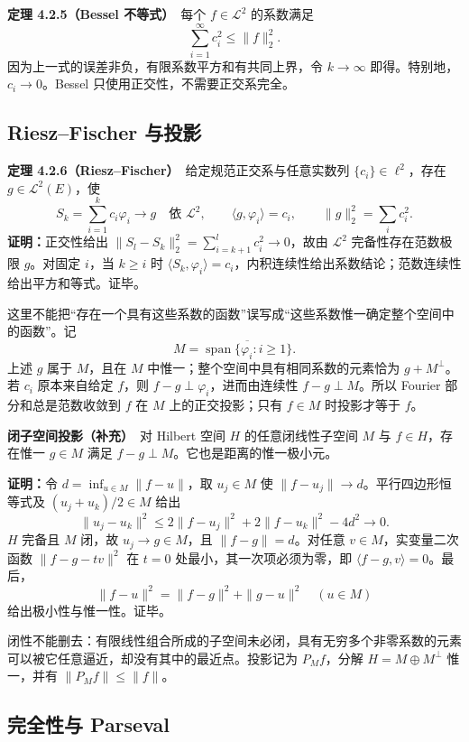 \documentclass[11pt,a4paper]{article}
\begin{document}
\textbf{定理 4.2.5（Bessel 不等式）}　每个 \(f\in\mathcal L^2\)
的系数满足 \[
\sum_{i=1}^\infty c_i^2\le\|f\|_2^2.
\] 因为上一式的误差非负，有限系数平方和有共同上界，令 \(k\to\infty\)
即得。特别地，\(c_i\to0\)。Bessel 只使用正交性，不需要正交系完全。

\subsection{Riesz--Fischer
与投影}\label{ch04-s2-rieszfischer-ux4e0eux6295ux5f71}

\textbf{定理 4.2.6（Riesz--Fischer）}　给定规范正交系与任意实数列
\(\{c_i\}\in\ell^2\)，存在 \(g\in\mathcal L^2(E)\)，使 \[
S_k=\sum_{i=1}^kc_i\varphi_i\longrightarrow g\quad\text{依 }\mathcal L^2,
\qquad\langle g,\varphi_i\rangle=c_i,
\qquad\|g\|_2^2=\sum_i c_i^2.
\] \textbf{证明：}正交性给出
\(\|S_l-S_k\|_2^2=\sum_{i=k+1}^lc_i^2\to0\)，故由 \(\mathcal L^2\)
完备性存在范数极限 \(g\)。对固定 \(i\)，当 \(k\ge i\) 时
\(\langle S_k,\varphi_i\rangle=c_i\)，内积连续性给出系数结论；范数连续性给出平方和等式。证毕。

这里不能把``存在一个具有这些系数的函数''误写成``这些系数惟一确定整个空间中的函数''。记
\[
M=\overline{\operatorname{span}\{\varphi_i:i\ge1\}}.
\] 上述 \(g\) 属于 \(M\)，且在 \(M\)
中惟一；整个空间中具有相同系数的元素恰为 \(g+M^\perp\)。若 \(c_i\)
原本来自给定 \(f\)，则 \(f-g\perp\varphi_i\)，进而由连续性
\(f-g\perp M\)。所以 Fourier 部分和总是范数收敛到 \(f\) 在 \(M\)
上的正交投影；只有 \(f\in M\) 时投影才等于 \(f\)。

\textbf{闭子空间投影（补充）}　对 Hilbert 空间 \(H\) 的任意闭线性子空间
\(M\) 与 \(f\in H\)，存在惟一 \(g\in M\) 满足
\(f-g\perp M\)。它也是距离的惟一极小元。

\textbf{证明：}令 \(d=\inf_{u\in M}\|f-u\|\)，取 \(u_j\in M\) 使
\(\|f-u_j\|\to d\)。平行四边形恒等式及 \((u_j+u_k)/2\in M\) 给出 \[
\|u_j-u_k\|^2
\le2\|f-u_j\|^2+2\|f-u_k\|^2-4d^2\longrightarrow0.
\] \(H\) 完备且 \(M\) 闭，故 \(u_j\to g\in M\)，且 \(\|f-g\|=d\)。对任意
\(v\in M\)，实变量二次函数 \(\|f-g-tv\|^2\) 在 \(t=0\)
处最小，其一次项必须为零，即 \(\langle f-g,v\rangle=0\)。最后， \[
\|f-u\|^2=\|f-g\|^2+\|g-u\|^2\quad(u\in M)
\] 给出极小性与惟一性。证毕。

闭性不能删去：有限线性组合所成的子空间未必闭，具有无穷多个非零系数的元素可以被它任意逼近，却没有其中的最近点。投影记为
\(P_Mf\)，分解 \(H=M\oplus M^\perp\) 惟一，并有 \(\|P_Mf\|\le\|f\|\)。

\subsection{完全性与 Parseval}\label{ch04-s2-ux5b8cux5168ux6027ux4e0e-parseval}
\end{document}
